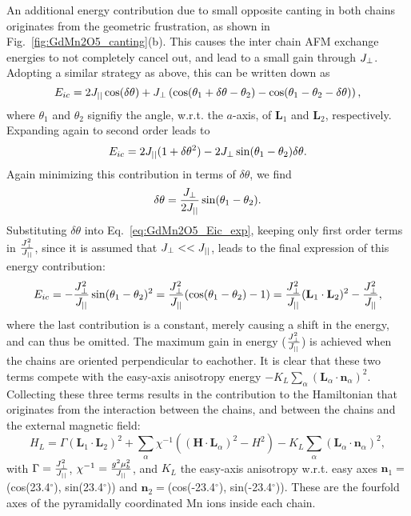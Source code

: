 An additional energy contribution due to small opposite canting in both chains originates from the geometric frustration, as shown in Fig.~\ref{fig:GdMn2O5_canting}(b). This causes the inter chain AFM exchange energies to not completely cancel out, and lead to a small gain through $J_{\perp}$.
Adopting a similar strategy as above, this can be written down as
\begin{equation}
	E_{ic} = 2 J_{||} \cos(\delta \theta) + J_{\perp} \left(\cos(\theta_1 + \delta \theta - \theta_2) - \cos(\theta_1 - \theta_2 -\delta \theta)\right),
\end{equation}
where $\theta_1$ and $\theta_2$ signifiy the angle, w.r.t. the $a$-axis, of $\mathbf{L}_1$ and $\mathbf{L}_2$, respectively.
Expanding again to second order leads to
\begin{equation}
	E_{ic} = 2 J_{||} ( 1+ \delta \theta^2) - 2 J_{\perp} \sin(\theta_1 - \theta_2)\delta \theta. \label{eq:GdMn2O5_Eic_exp}
\end{equation}
Again minimizing this contribution in terms of $\delta \theta$, we find
\begin{equation}
	\delta \theta = \frac{J_{\perp}}{2 J_{||}} \sin(\theta_1 - \theta_2).
\end{equation}
Substituting $\delta \theta$ into Eq.~\ref{eq:GdMn2O5_Eic_exp}, keeping only first order terms in $\frac{J_{\perp}^2}{J_{||}}$, since it is assumed that $J_{\perp} << J_{||}$, leads to the final expression of this energy contribution:
\begin{equation}
	E_{ic} = -\frac{J_{\perp}^2}{J_{||}}\sin(\theta_1 - \theta_2)^2 =  \frac{J_{\perp}^2}{J_{||}}(\cos(\theta_1 - \theta_2) - 1) = \frac{J_{\perp}^2}{J_{||}}(\mathbf{L}_1 \cdot \mathbf{L}_2)^2 - \frac{J_{\perp}^2}{J_{||}},
\end{equation}
where the last contribution is a constant, merely causing a shift in the energy, and can thus be omitted.
The maximum gain in energy ($\frac{J_{\perp}^2}{J_{||}}$) is achieved when the chains are oriented perpendicular to eachother.
It is clear that these two terms compete with the easy-axis anisotropy energy $-K_L\sum_\alpha(\mathbf{L}_\alpha\cdot \mathbf{n}_\alpha)^2$.
Collecting these three terms results in the contribution to the Hamiltonian that originates from the interaction between the chains, and between the chains and the external magnetic field:
\begin{equation}
	H_L = \Gamma(\mathbf{L}_1\cdot \mathbf{L}_2)^2
    +\sum_{\alpha}\chi^{-1}((\mathbf{H}\cdot \mathbf{L}_\alpha)^2-H^2)
    -K_L\sum_\alpha(\mathbf{L}_\alpha\cdot \mathbf{n}_\alpha)^2\label{eq:GdMn2O5_hami_1},
\end{equation}
with $\Gamma = \frac{J_{\perp}^2}{J_{||}}$, $\chi^{-1} = \frac{g^2\mu_b^2}{J_{||}}$, and $K_L$ the easy-axis anisotropy w.r.t. easy axes $\mathbf{n}_1=$(cos(23.4$^\circ$), sin(23.4$^\circ$)) and $\mathbf{n}_2=$(cos(-23.4$^\circ$), sin(-23.4$^\circ$)). These are the fourfold axes of the pyramidally coordinated Mn ions inside each chain.


